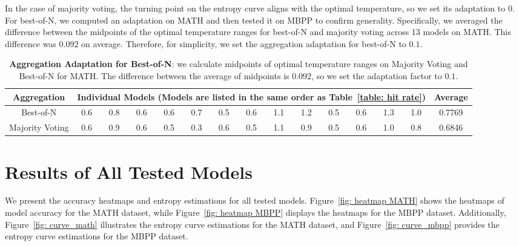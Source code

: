 In the case of majority voting, the turning point on the entropy curve aligns with the optimal temperature, so we set its adaptation to 0. For best-of-N, we computed an adaptation on MATH and then tested it on MBPP to confirm generality. Specifically, we averaged the difference between the midpoints of the optimal temperature ranges for best-of-N and majority voting across 13 models on MATH. This difference was $0.092$ on average. Therefore, for simplicity, we set the aggregation adaptation for best-of-N to $0.1$.

\begin{table}[ht]
\centering
\caption{\textbf{Aggregation Adaptation for Best-of-N}: we calculate midpoints of optimal temperature ranges on Majority Voting and Best-of-N for MATH. The difference between the average of midpoints is $0.092$, so we set the adaptation factor to $0.1$.}
\begin{tabular}{c|ccccccccccccc|c}
\toprule
Aggregation & \multicolumn{13}{c|}{Individual Models (Models are listed in the same order as Table~\ref{table: hit rate})} & Average \\
\hline
Best-of-N & 0.6 & 0.8 & 0.6 & 0.6 & 0.7 & 0.5 & 0.6 & 1.1 & 1.2 & 0.5 & 0.6 & 1.3 & 1.0 & 0.7769\\
Majority Voting & 0.6 & 0.9 & 0.6 & 0.5 & 0.3 & 0.6 & 0.5 & 1.1 & 0.9 & 0.5 & 0.6 & 1.0 & 0.8 & 0.6846\\
\bottomrule
\end{tabular}
\label{tab:averages}
\end{table}

\section{Results of All Tested Models}

We present the accuracy heatmaps and entropy estimations for all tested models. Figure~\ref{fig: heatmap MATH} shows the heatmaps of model accuracy for the MATH dataset, while Figure~\ref{fig: heatmap MBPP} displays the heatmaps for the MBPP dataset. Additionally, Figure~\ref{fig: curve_math} illustrates the entropy curve estimations for the MATH dataset, and Figure~\ref{fig: curve_mbpp} provides the entropy curve estimations for the MBPP dataset.

